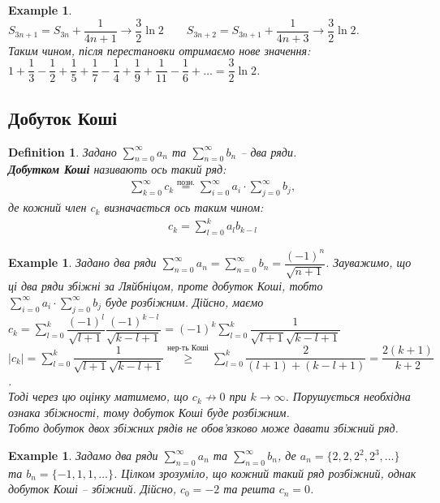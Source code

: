 \documentclass[a4paper, 10pt]{article}
\theoremstyle{theoremdd}
\theoremstyle{theoremdd}
\theoremstyle{theoremdd}
\newtheorem{definition}[theorem]{Definition}
\theoremstyle{theoremdd}
\theoremstyle{theoremdd}
\newtheorem{example}[theorem]{Example}
\theoremstyle{theoremdd}
\theoremstyle{theoremdd}
\theoremstyle{theoremdd}
\theoremstyle{theoremdd}
\begin{document}
\begin{example}
$S_{3n+1} = S_{3n} + \dfrac{1}{4n+1} \to \dfrac{3}{2} \ln 2 \qquad S_{3n+2} = S_{3n+1} + \dfrac{1}{4n+3} \to \dfrac{3}{2} \ln 2$.\\
Таким чином, після перестановки отримаємо нове значення:\\
$1 + \dfrac{1}{3} - \dfrac{1}{2} + \dfrac{1}{5} + \dfrac{1}{7} - \dfrac{1}{4} + \dfrac{1}{9} + \dfrac{1}{11} - \dfrac{1}{6} + \dots = \dfrac{3}{2} \ln 2$.
\end{example}

\subsection{Добуток Коші}
\begin{definition}
Задано $\displaystyle\sum_{n=0}^\infty a_n$ та $\displaystyle\sum_{n=0}^\infty b_n$ -- два ряди.\\
\textbf{Добутком Коші} називають ось такий ряд:
\begin{align*}
\sum_{k=0}^\infty c_k \overset{\text{позн.}}{=} \sum_{i=0}^\infty a_i \cdot \sum_{j=0}^\infty b_j,
\end{align*}
де кожний член $c_k$ визначається ось таким чином:
\begin{align*}
c_k = \sum_{l=0}^k a_l b_{k-l}
\end{align*}
\end{definition}

\begin{example}
Задано два ряди $\displaystyle\sum_{n=0}^\infty a_n = \sum_{n=0}^\infty b_n = \dfrac{(-1)^n}{\sqrt{n+1}}$. Зауважимо, що ці два ряди збіжні за Ляйбніцом, проте добуток Коші, тобто $\displaystyle \sum_{i=0}^\infty a_i \cdot \sum_{j=0}^\infty b_j$ буде розбіжним. Дійсно, маємо\\
$c_k = \displaystyle\sum_{l=0}^k \dfrac{(-1)^l}{\sqrt{l+1}} \dfrac{(-1)^{k-l}}{\sqrt{k-l+1}} = (-1)^k \sum_{l=0}^k \dfrac{1}{\sqrt{l+1} \sqrt{k-l+1}}$\\
$|c_k| = \displaystyle\sum_{l=0}^k \dfrac{1}{\sqrt{l+1} \sqrt{k-l+1}} \overset{\text{нер-ть Коші}}{\geq} \sum_{l=0}^k \dfrac{2}{(l+1)+(k-l+1)} = \dfrac{2(k+1)}{k+2}$.\\
Тоді через цю оцінку матимемо, що $c_k \not\to 0$ при $k \to \infty$. Порушується необхідна ознака збіжності, тому добуток Коші буде розбіжним.\\
Тобто добуток двох збіжних рядів не обов'язково може давати збіжний ряд.
\end{example}

\begin{example}
Задамо два ряди $\displaystyle\sum_{n=0}^\infty a_n$ та $\displaystyle\sum_{n=0}^\infty b_n$, де $a_n = \{2,2,2^2,2^3,\dots\}$ та $b_n = \{-1,1,1,\dots\}$. Цілком зрозуміло, що кожний такий ряд розбіжний, однак добуток Коші -- збіжний. Дійсно, $c_0 = -2$ та решта $c_n = 0$.
\end{example}
\end{document}

